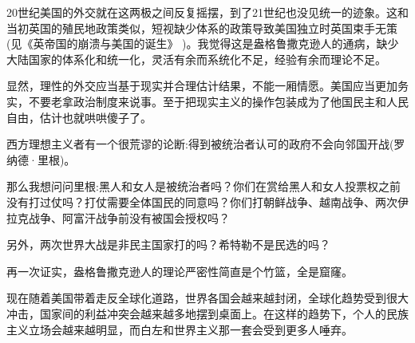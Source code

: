 20世纪美国的外交就在这两极之间反复摇摆，到了21世纪也没见统一的迹象。这和当初英国的殖民地政策类似，短视缺少体系的政策导致美国独立时英国束手无策(见《英帝国的崩溃与美国的诞生》 )。我觉得这是盎格鲁撒克逊人的通病，缺少大陆国家的体系化和统一化，灵活有余而系统化不足，经验有余而理论不足。

显然，理性的外交应当基于现实并合理估计结果，不能一厢情愿。美国应当更加务实，不要老拿政治制度来说事。至于把现实主义的操作包装成为了他国民主和人民自由，估计也就哄哄傻子了。

西方理想主义者有一个很荒谬的论断:得到被统治者认可的政府不会向邻国开战(罗纳德·里根)。

那么我想问问里根:黑人和女人是被统治者吗？你们在赏给黑人和女人投票权之前没有打过仗吗？打仗需要全体国民的同意吗？你们打朝鲜战争、越南战争、两次伊拉克战争、阿富汗战争前没有被国会授权吗？

另外，两次世界大战是非民主国家打的吗？希特勒不是民选的吗？

再一次证实，盎格鲁撒克逊人的理论严密性简直是个竹篮，全是窟窿。

现在随着美国带着走反全球化道路，世界各国会越来越封闭，全球化趋势受到很大冲击，国家间的利益冲突会越来越多地摆到桌面上。在这样的趋势下，个人的民族主义立场会越来越明显，而白左和世界主义那一套会受到更多人唾弃。
